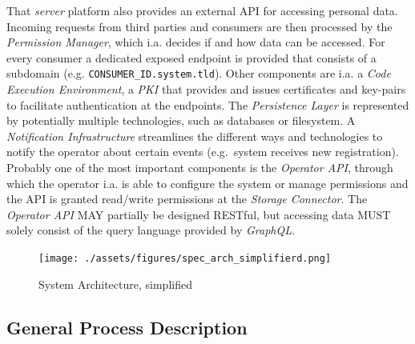 \documentclass[12pt,english,a4paper,titlepage,cleardoublepage=empty,dottedtoc]{report}
\begin{document}
That \emph{server} platform also provides an external API for accessing
personal data. Incoming requests from third parties and consumers are
then processed by the \emph{Permission Manager}, which i.a. decides if
and how data can be accessed. For every consumer a dedicated exposed
endpoint is provided that consists of a subdomain (e.g.
\texttt{CONSUMER\_ID.system.tld}). Other components are i.a. a
\emph{Code Execution Environment}, a \emph{PKI} that provides and issues
certificates and key-pairs to facilitate authentication at the
endpoints. The \emph{Persistence Layer} is represented by potentially
multiple technologies, such as databases or filesystem. A
\emph{Notification Infrastructure} streamlines the different ways and
technologies to notify the operator about certain events (e.g.~system
receives new registration). Probably one of the most important
components is the \emph{Operator API}, through which the operator i.a.
is able to configure the system or manage permissions and the API is
granted read/write permissions at the \emph{Storage Connector}. The
\emph{Operator API} MAY partially be designed RESTful, but accessing
data MUST solely consist of the query language provided by
\emph{GraphQL}.

\begin{figure}
\centering
\texttt{[image: ./assets/figures/spec\_arch\_simplifierd.png]}
\caption{System Architecture,
simplified\label{fig:spec_arch_simplifier}}
\end{figure}

\subsection{General Process
Description}\label{general-process-description}
\end{document}

